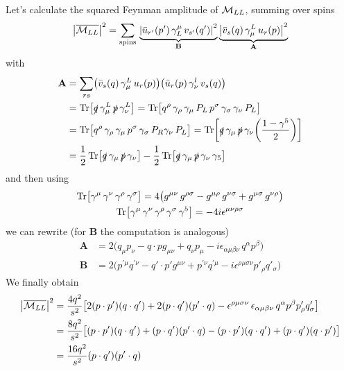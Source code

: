 \documentclass[TheoreticalPhy_ModB.tex]{subfiles}
\begin{document}
Let's calculate the squared Feynman amplitude of $\mathcal{M}_{LL}$, summing over spins
\[
\abs{\overline{\mathcal{M}_{LL}}}^2 = \sum_{\text{spins}} \,
	\underbrace{\abs{ \bar{u}_{r'}(p') \, \gamma^{\mu}_L \, v_{s'}(q') }^2}_{\textbf{B}}
	\underbrace{\abs{ \bar{v}_s(q) \, \gamma^L_{\mu} \, u_r(p) }^2}_{\textbf{A}}
\]
with
\[
\begin{split}
\textbf{A}	& = \sum_{r s} \bigl( \bar{v}_s(q) \, \gamma^L_{\mu} \, u_r(p) \bigr) \bigl(	\bar{u}_r(p) \, \gamma^l_{\nu} \, v_s(q) \bigr) \\
		& = \Tr \bigl[ \slashed q \, \gamma_{\mu}^L \, \slashed p \, \gamma_{\nu}^L \bigr]
			= \Tr \bigl[ q^{\rho} \, \gamma_{\rho} \, \gamma_{\mu} \, P_L \, p^{\sigma} \, \gamma_{\sigma} \, \gamma_{\nu} \, P_L \bigr] \\
		& = \Tr \bigl[ q^{\rho} \, \gamma_{\rho} \, \gamma_{\mu} \, p^{\sigma} \, \gamma_{\sigma} \, P_R \gamma_{\nu} \, P_L \bigr]
			= \Tr \biggl[ \slashed q \, \gamma_{\mu} \, \slashed p \, \gamma_{\nu} \biggl( \frac{1-\gamma^5}{2} \biggr) \biggr] \\
		& = \frac{1}{2} \Tr \bigl[ \slashed q \, \gamma_{\mu} \, \slashed p \, \gamma_{\nu} \bigr]
			- \frac{1}{2} \Tr \bigl[ \slashed q \, \gamma_{\mu} \, \slashed p \, \gamma_{\nu} \, \gamma_5 \bigr]
\end{split}
\]
and then using
\begin{gather*}
\Tr \bigl[ \gamma^{\mu} \, \gamma^{\nu} \, \gamma^{\rho} \, \gamma^{\sigma} \bigr] 
	= 4 \bigl( g^{\mu\nu} \, g^{\rho\sigma} - g^{\mu\rho} \, g^{\nu\sigma} + g^{\mu\sigma} \, g^{\nu\rho} \bigr) \\
\Tr \bigl[ \gamma^{\mu} \, \gamma^{\nu} \, \gamma^{\rho} \, \gamma^{\sigma} \, \gamma^5 \bigr] = -4i\epsilon^{\mu\nu\rho\sigma} 
\end{gather*}
we can rewrite (for \textbf{B} the computation is analogous)
\begin{align*}
\textbf{A}	& = 2 \bigl( q_{\mu}p_{\nu} - q \cdot p g_{\mu\nu} + q_{\nu}p_{\mu} - i \epsilon_{\alpha\mu\beta\nu} \, q^{\alpha}p^{\beta} \bigr) \\
\textbf{B}	& = 2 \bigl( p^{\prime \mu} q^{\prime \nu} - q' \cdot p' g^{\mu\nu} + p^{\prime \nu} q^{\prime \mu} 
	- i \epsilon^{\rho\mu\sigma\nu} p'_{\rho} q'_{\sigma} \bigr)
\end{align*}
We finally obtain
\begin{align*}
\abs{\overline{\mathM_{LL}}}^2 
	& = \frac{4q^2}{s^2} \bigl[ 2(p \cdot p')(q \cdot q') + 2(p \cdot q')(p' \cdot q) - \epsilon^{\rho\mu\sigma\nu} \, \epsilon_{\alpha\mu\beta\nu} \,
		q^{\alpha} p^{\beta} p'_{\rho} q'_{\sigma} \bigr] \\
	& = \frac{8q^2}{s^2} \bigl[ (p \cdot p') (q \cdot q') + (p \cdot q')(p' \cdot q) - (p \cdot p')(q \cdot q') + (p \cdot q')(q \cdot p') \bigr] \\
	& =  \frac{16q^2}{s^2} (p \cdot q')(p' \cdot q)
\end{align*}
\end{document}
